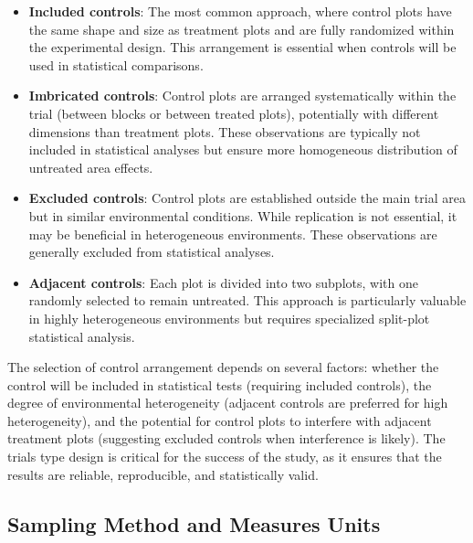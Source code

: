 \documentclass[12pt,a4paper,oneside]{report}
\begin{document}
\begin{itemize}
    \item \textbf{Included controls}: The most common approach, where control plots 
    have the same shape and size as treatment plots and are fully randomized within 
    the experimental design. This arrangement is essential when controls 
    will be used in statistical comparisons.
    
    \item \textbf{Imbricated controls}: Control plots are arranged systematically 
    within the trial (between blocks or between treated plots), potentially with 
    different dimensions than treatment plots. These observations are typically 
    not included in statistical analyses but ensure more homogeneous distribution 
    of untreated area effects.
    
    \item \textbf{Excluded controls}: Control plots are established outside the 
    main trial area but in similar environmental conditions. While replication is 
    not essential, it may be beneficial in heterogeneous environments. These observations 
    are generally excluded from statistical analyses.
    
    \item \textbf{Adjacent controls}: Each plot is divided into two subplots, with 
    one randomly selected to remain untreated. This approach is particularly valuable 
    in highly heterogeneous environments but requires specialized split-plot statistical 
    analysis.
\end{itemize}

The selection of control arrangement depends on several factors: whether the control 
will be included in statistical tests (requiring included controls), the degree 
of environmental heterogeneity (adjacent controls are preferred for high heterogeneity), 
and the potential for control plots to interfere with adjacent treatment plots (suggesting 
excluded controls when interference is likely).
The trials type design is critical for the success of the study, as it ensures
that the results are reliable, reproducible, and statistically valid.

\subsection{Sampling Method and Measures Units}
\end{document}
